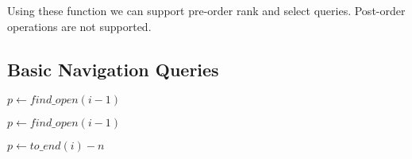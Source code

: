 \begin{algorithmic}
		\State {} 
		\State {} 
	\Else
		\State {}
	\EndIf
\EndFunction
\end{algorithmic}

\begin{algorithmic}
		\State {}
	\Else
		\State {}
	\EndIf
\EndFunction
\end{algorithmic}

Using these function we can support pre-order rank and select queries.
Post-order operations are not supported.

\begin{algorithmic}
	\State {}
\EndFunction
\end{algorithmic}

\begin{algorithmic}
	\State {}
\EndFunction
\end{algorithmic}

\subsection{Basic Navigation Queries}

\begin{algorithmic}
		\State {}
	\Else
		\State $p \gets find\_open(i - 1)$ 
		\State {}
	\EndIf
\EndFunction
\end{algorithmic}

\begin{algorithmic}
	\State {}
\EndFunction
\end{algorithmic}

\begin{algorithmic}
		\State {}
	\Else
		\State $p \gets find\_open(i - 1)$
		\State {}
	\EndIf
\EndFunction
\end{algorithmic}

\begin{algorithmic}
		\State {}
	\Else
		\State $p \gets to\_end(i) - n$
		\State {}
	\EndIf
\EndFunction
\end{algorithmic}

